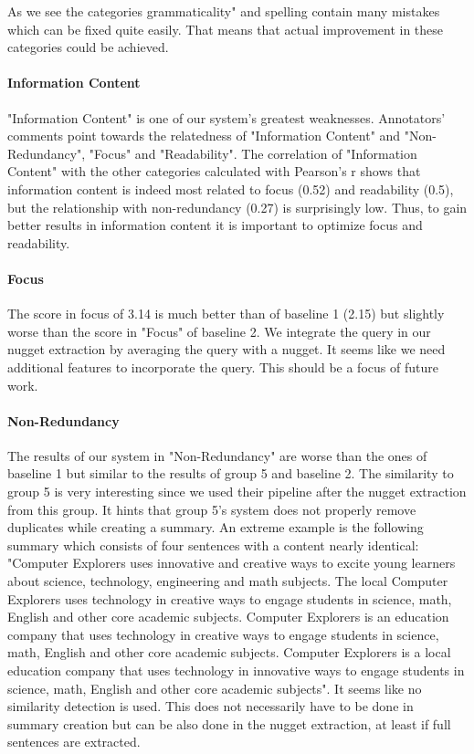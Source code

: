 As we see the categories grammaticality" and spelling contain many mistakes which can be fixed quite easily. That means that actual improvement in these categories could be achieved.

\paragraph{Information Content}
"Information Content" is one of our system's greatest weaknesses. Annotators' comments point towards the relatedness of "Information Content" and "Non-Redundancy", "Focus" and "Readability". The correlation of "Information Content" with the other categories calculated with Pearson's r shows that information content is indeed most related to focus (0.52) and readability (0.5), but the relationship with non-redundancy (0.27) is surprisingly low.
Thus, to gain better results in information content it is important to optimize focus and readability.

\paragraph{Focus}
The score in focus of 3.14 is much better than of baseline 1 (2.15) but slightly worse than the score in "Focus" of baseline 2. We integrate the query in our nugget extraction by averaging the query with a nugget. It seems like we need additional features to incorporate the query. This should be a focus of future work.

\paragraph{Non-Redundancy}
The results of our system in "Non-Redundancy" are worse than the ones of baseline 1 but similar to the results of group 5 and baseline 2. The similarity to group 5 is very interesting since we used their pipeline after the nugget extraction from this group. It hints that group 5's system does not properly remove duplicates while creating a summary. An extreme example is the following summary which consists of four sentences with a content nearly identical: "Computer Explorers uses innovative and creative ways to excite young learners about science, technology, engineering and math subjects. The local Computer Explorers uses technology in creative ways to engage students in science, math, English and other core academic subjects. Computer Explorers is an education company that uses technology in creative ways to engage students in science, math, English and other core academic subjects. Computer Explorers is a local education company that uses technology in innovative ways to engage students in science, math, English and other core academic subjects". It seems like no similarity detection is used. This does not necessarily have to be done in summary creation but can be also done in the nugget extraction, at least if full sentences are extracted.

